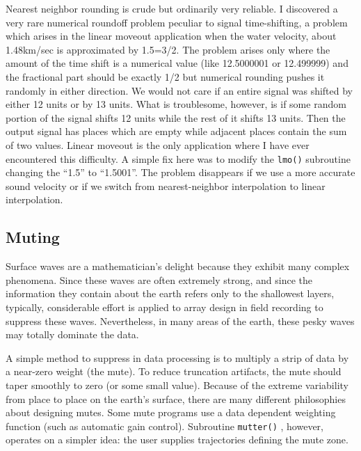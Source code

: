 \par
Nearest neighbor rounding is crude but ordinarily very reliable.
I discovered a very rare numerical roundoff problem
peculiar to signal time-shifting, a problem
which arises in the linear moveout application
when the water velocity, about 1.48km/sec is approximated by 1.5=3/2.
The problem arises only where the amount of the time shift
is a numerical value (like 12.5000001 or 12.499999)
and the fractional part should be exactly 1/2 but
numerical rounding pushes it randomly in either direction.
We would not care if an entire signal was shifted
by either 12 units or by 13 units.
What is troublesome, however, is if some random portion
of the signal shifts 12 units while the rest of it shifts 13 units.
Then the output signal has places which are empty while
adjacent places contain the sum of two values.
Linear moveout is the only application
where I have ever encountered this difficulty.
A simple fix here was to modify the
\texttt{lmo()} 
subroutine changing
the ``1.5'' to ``1.5001''.
The problem disappears if we use a more accurate sound velocity
or if we switch from nearest-neighbor interpolation
to linear interpolation.

\subsection{Muting}
Surface waves are a mathematician's delight
because they exhibit many complex phenomena.
Since these waves are often extremely strong,
and since the information they contain about the earth
refers only to the shallowest layers,
typically,
considerable effort is applied to array design in field recording
to suppress these waves.
Nevertheless, in many areas of the earth,
these pesky waves may totally dominate the data.

\par
A simple method to suppress  in data processing
is to multiply a strip of data by a near-zero weight (the mute).
To reduce truncation artifacts,
the mute should taper smoothly to zero (or some small value).
Because of the extreme variability from place to place
on the earth's surface,
there are many different philosophies
about designing mutes.
Some mute programs use a data dependent weighting function
(such as automatic gain control).
Subroutine \texttt{mutter()} ,
however, operates on a simpler idea: 
the user supplies trajectories defining the mute zone.

